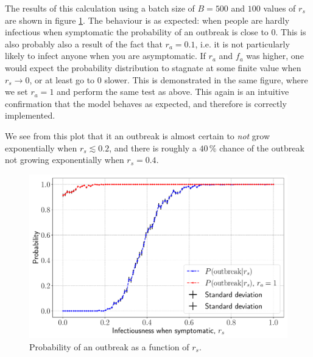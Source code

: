 The results of this calculation using a batch size of $B = 500$ and $100$ values of $r_s$ are shown in figure \ref{fig:rs_prob}. The behaviour is as expected: when people are hardly infectious when symptomatic the probability of an outbreak is close to $0$. This is also probably also a result of the fact that $r_a = 0.1$, i.e. it is not particularly likely to infect anyone when you are asymptomatic. If $r_a$ and $f_a$ was higher, one would expect the probability distribution to stagnate at some finite value when $r_s \to 0$, or at least go to $0$ slower. This is demonstrated in the same figure, where we set $r_a = 1$ and perform the same test as above. This again is an intuitive confirmation that the model behaves as expected, and therefore is correctly implemented.

We see from this plot that it an outbreak is almost certain to \textit{not} grow exponentially when $r_s \lesssim 0.2$, and there is roughly a $40 \, \%$ chance of the outbreak not growing exponentially when $r_s = 0.4$. 

\begin{figure}[htb]
	\centering
	\includegraphics[width=0.8\columnwidth]{../fig/2Cb_probs.pdf}
	\caption{Probability of an outbreak as a function of $r_s$.}
	\label{fig:rs_prob}
\end{figure}


\clearpage